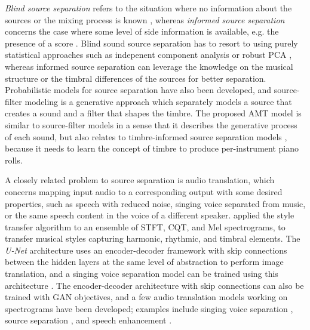 \emph{Blind source separation} refers to the situation where no information about the sources or the mixing process is known \cite{bell1995blind}, whereas \emph{informed source separation} \cite{vincent2013separation} concerns the case where some level of side information is available, e.g. the presence of a score \cite{ewert2014separation}.
Blind sound source separation has to resort to using purely statistical approaches such as indepenent component analysis \cite{saruwatari2006ica} or robust PCA \cite{huang2012separation}, whereas informed source separation can leverage the knowledge on the musical structure \cite{rafii2013separation, liutkus2012separation} or the timbral differences of the sources \cite{li2007separation,ono2010hpss} for better separation.
Probabilistic models for source separation \cite{ozerov2007separation,leglaive2016prior} have also been developed, and source-filter modeling \cite{heittola2009separation,durrieu2011separation} is a generative approach which separately models a source that creates a sound and a filter that shapes the timbre.
The proposed AMT model is similar to source-filter models in a sense that it describes the generative process of each sound, but also relates to timbre-informed source separation models \cite{miron2018thesis}, because it needs to learn the concept of timbre to produce per-instrument piano rolls.


A closely related problem to source separation is audio translation, which concerns mapping input audio to a corresponding output with some desired properties, such as speech with reduced noise, singing voice separated from music, or the same speech content in the voice of a different speaker.
 applied the style transfer algorithm \cite{gatys2015style} to an ensemble of STFT, CQT, and Mel spectrograms, to transfer musical styles capturing harmonic, rhythmic, and timbral elements.
The \emph{U-Net} architecture \cite{ronneberger2015unet} uses an encoder-decoder framework with skip connections between the hidden layers at the same level of abstraction to perform image translation, and a singing voice separation model can be trained using this architecture \cite{jansson2017separation}.
The encoder-decoder architecture with skip connections can also be trained with GAN objectives, and a few audio translation models working on spectrograms have been developed; examples include singing voice separation \cite{fan2017svsgan, stoller2017separation}, source separation \cite{subakan2017gan}, and speech enhancement \cite{pascual2017segan, donahue2017segan}.



